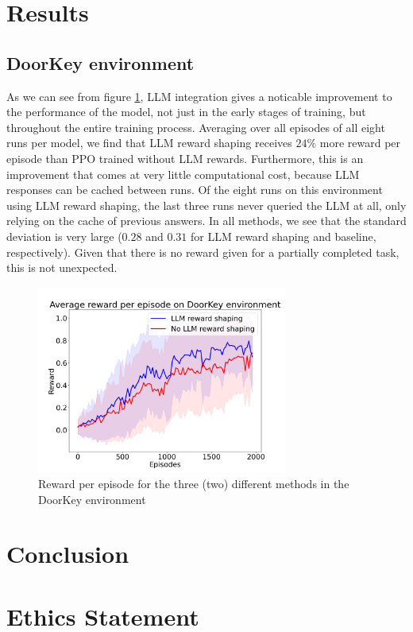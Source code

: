 \documentclass[conference]{IEEEtran}
\begin{document}
\section{Results}

\subsection{DoorKey environment}

As we can see from figure \ref{doorkeyresults}, LLM integration gives a noticable improvement to the performance of the model, not just in the early stages of training, but throughout the entire training process. Averaging over all episodes of all eight runs per model, we find that LLM reward shaping receives $24\%$ more reward per episode than PPO trained without LLM rewards. Furthermore, this is an improvement that comes at very little computational cost, because LLM responses can be cached between runs. Of the eight runs on this environment using LLM reward shaping, the last three runs never queried the LLM at all, only relying on the cache of previous answers. In all methods, we see that the standard deviation is very large ($0.28$ and $0.31$ for LLM reward shaping and baseline, respectively). Given that there is no reward given for a partially completed task, this is not unexpected.

\begin{figure}[h]
\centerline{\includegraphics[width=3.25in]{figure/doorkeyresults.png}}
\caption{Reward per episode for the three (two) different methods in the DoorKey environment}
\label{doorkeyresults}
\end{figure}


\section{Conclusion}

\section*{Ethics Statement}
\end{document}
